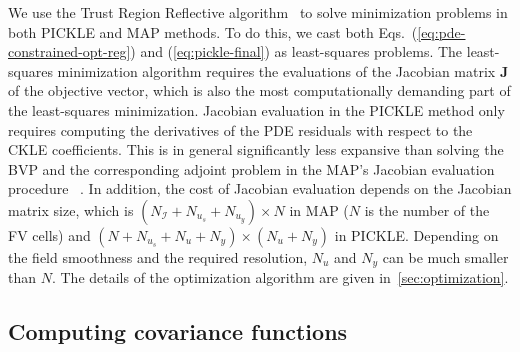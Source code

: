 \documentclass{agujournal2019}
\begin{document}
We use the Trust Region Reflective algorithm~\citep{branch1999} to solve minimization problems in both PICKLE and MAP methods.
  To do this, we cast both Eqs.~(\ref{eq:pde-constrained-opt-reg}) and (\ref{eq:pickle-final}) as least-squares problems.
The least-squares minimization algorithm requires the evaluations of the Jacobian matrix $\mathbf{J}$ of the objective vector, which is also the most computationally demanding part of the least-squares minimization.
Jacobian evaluation in the PICKLE method only requires computing the derivatives of the PDE residuals with respect to the CKLE coefficients. This is in general significantly less expansive  than solving the BVP and the corresponding adjoint problem in the MAP's Jacobian evaluation procedure ~\citep{barajassolano-2014-linear}.
  In addition, the cost of Jacobian evaluation depends on the Jacobian matrix size, which is $(N_{\mathcal{I}} + N_{u_s} + N_{u_y}) \times N$ in MAP ($N$ is the number of the FV cells) and $(N + N_{u_s} + N_u + N_y) \times (N_u + N_y)$ in PICKLE.
  Depending on the field smoothness and the required resolution, $N_u$ and $N_y$ can be much smaller than $N$.
The details of the optimization algorithm are given in~\ref{sec:optimization}.


  
\subsection{Computing covariance functions}\label{covariances}
\end{document}

